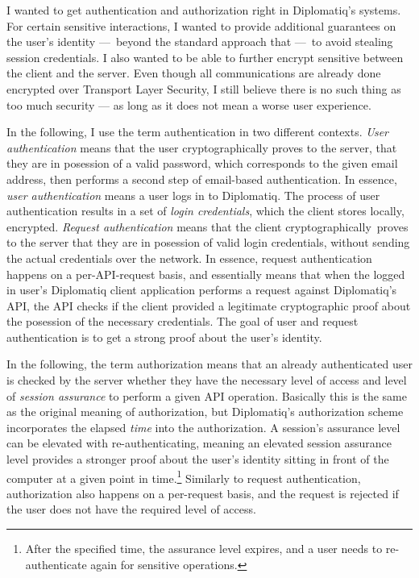 I wanted to get authentication and authorization right in Diplomatiq's systems. For certain sensitive interactions, I wanted to provide additional guarantees on the user's identity — beyond the standard approach that  — to avoid stealing session credentials. I also wanted to be able to further encrypt sensitive between the client and the server. Even though all communications are already done encrypted over Transport Layer Security, I still believe there is no such thing as too much security — as long as it does not mean a worse user experience.

In the following, I use the term authentication in two different contexts. \emph{User authentication} means that the user cryptographically proves to the server, that they are in posession of a valid password, which corresponds to the given email address, then performs a second step of email-based authentication. In essence, \emph{user authentication} means a user logs in to Diplomatiq. The process of user authentication results in a set of \emph{login credentials}, which the client stores locally, encrypted. \emph{Request authentication} means that the client cryptographically proves to the server that they are in posession of valid login credentials, without sending the actual credentials over the network. In essence, request authentication happens on a per-API-request basis, and essentially means that when the logged in user's Diplomatiq client application performs a request against Diplomatiq's API, the API checks if the client provided a legitimate cryptographic proof about the posession of the necessary credentials. The goal of user and request authentication is to get a strong proof about the user's identity.

In the following, the term authorization means that an already authenticated user is checked by the server whether they have the necessary level of access and level of \emph{session assurance} to perform a given API operation. Basically this is the same as the original meaning of authorization, but Diplomatiq's authorization scheme incorporates the elapsed \emph{time} into the authorization. A session's assurance level can be elevated with re-authenticating, meaning an elevated session assurance level provides a stronger proof about the user's identity sitting in front of the computer at a given point in time.\footnote{After the specified time, the assurance level expires, and a user needs to re-authenticate again for sensitive operations.} Similarly to request authentication, authorization also happens on a per-request basis, and the request is rejected if the user does not have the required level of access.

